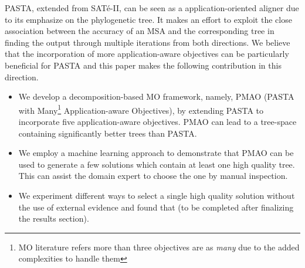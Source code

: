 PASTA, extended from SAT\'e-II, can be seen as a application-oriented aligner due to its emphasize on the phylogenetic tree. It
makes an effort to exploit the close association between the
accuracy of an MSA and the corresponding tree in finding
the output through multiple iterations from both directions.
We believe that the incorporation of more application-aware objectives can
be particularly beneficial for PASTA and this paper makes the following contribution in this direction. 

\begin{itemize}
	\item We develop a decomposition-based MO framework, namely, PMAO (PASTA with Many\footnote{ MO literature refers more than three objectives are as \textit{many}\cite{li2015many} due to the added complexities to handle them} Application-aware Objectives), by extending PASTA to incorporate five application-aware objectives. PMAO can lead to a tree-space containing significantly better trees than PASTA. 

	\item We employ a machine learning approach to demonstrate that PMAO can be used to generate a few solutions which contain at least one high quality tree. This can assist the domain expert to choose the one by manual inspection.
	
	\item We experiment different ways to select a single high quality solution without the use of external evidence and found that (to be completed after finalizing the results section).

	
\end{itemize}

